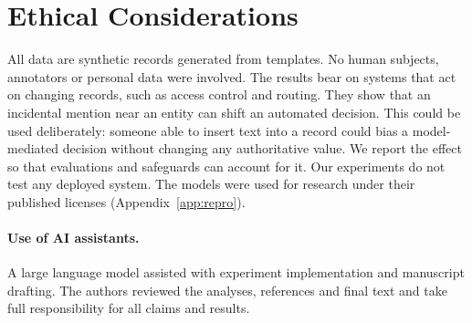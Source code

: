 \section*{Ethical Considerations}

All data are synthetic records generated from templates. No human subjects, annotators or personal data
were involved. The results bear on systems that act on changing records, such as access control and
routing. They show that an incidental mention near an entity can shift an automated decision. This
could be used deliberately: someone able to insert text into a record could bias a model-mediated
decision without changing any authoritative value. We report the effect so that evaluations and
safeguards can account for it. Our experiments do not test any deployed system. The models were used
for research under their published licenses (Appendix~\ref{app:repro}).

\paragraph{Use of AI assistants.} A large language model assisted with experiment implementation and
manuscript drafting. The authors reviewed the analyses, references and final text and take full
responsibility for all claims and results.
